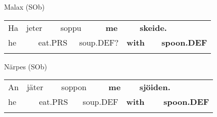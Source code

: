 
\begin{listWWNumileveli}
\item {}

\end{listWWNumileveli}

\begin{listWWNumxlixleveli}
\item {}

\begin{styleExLtrTbl}
Malax (SOb)

\end{styleExLtrTbl}

\end{listWWNumxlixleveli}

\begin{tabular}{llllllllll}
\lsptoprule
Ha & \multicolumn{2}{l}{jeter

} & \multicolumn{2}{l}{soppu

} & \multicolumn{2}{l}{{\bfseries me}

} & \multicolumn{2}{l}{{\bfseries skeide.}

} & \\
\multicolumn{2}{l}{he

} & \multicolumn{2}{l}{eat.PRS

} & \multicolumn{2}{l}{soup.DEF?

} & \multicolumn{2}{l}{{\bfseries with}

} & \multicolumn{2}{l}{{\bfseries spoon.DEF}

}\\
\lspbottomrule
\end{tabular}

\begin{styleExLtrTblii}
Närpes (SOb)

\end{styleExLtrTblii}

\begin{tabular}{llllllllll}
\lsptoprule
An & \multicolumn{2}{l}{jäter

} & \multicolumn{2}{l}{soppon

} & \multicolumn{2}{l}{{\bfseries me}

} & \multicolumn{2}{l}{{\bfseries sjöiden.}

} & \\
\multicolumn{2}{l}{he

} & \multicolumn{2}{l}{eat.PRS

} & \multicolumn{2}{l}{soup.DEF

} & \multicolumn{2}{l}{{\bfseries with}

} & \multicolumn{2}{l}{{\bfseries spoon.DEF}

}\\
\lspbottomrule
\end{tabular}

